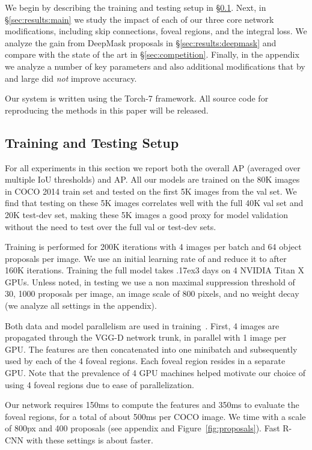 \documentclass{bmvc2k}
\newcommand{\app}{\raise.17ex\hbox{}}
\newcommand{\AP}[1]{AP\xspace}
\newcommand{\fig}[1]{Figure~\ref{fig:#1}}
\begin{document}
We begin by describing the training and testing setup in \S\ref{sec:results:setup}. Next, in \S\ref{sec:results:main} we study the impact of each of our three core network modifications, including skip connections, foveal regions, and the integral loss. We analyze the gain from DeepMask proposals in \S\ref{sec:results:deepmask} and compare with the state of the art in \S\ref{sec:competition}. Finally, in the appendix we analyze a number of key parameters and also additional modifications that by and large did \emph{not} improve accuracy. 

Our system is written using the Torch-7 framework. All source code for reproducing the methods in this paper will be released.

\subsection{Training and Testing Setup}\label{sec:results:setup}

For all experiments in this section we report both the overall AP (averaged over multiple IoU thresholds) and \AP{50}. All our models are trained on the 80K images in COCO 2014 train set and tested on the first 5K images from the val set. We find that testing on these 5K images correlates well with the full 40K val set and 20K test-dev set, making these 5K images a good proxy for model validation without the need to test over the full val or test-dev sets.

Training is performed for 200K iterations with 4 images per batch and 64 object proposals per image. We use an initial learning rate of  and reduce it to  after 160K iterations. Training the full model takes \app3 days on 4 NVIDIA Titan X GPUs. Unless noted, in testing we use a non maximal suppression threshold of 30, 1000 proposals per image, an image scale of 800 pixels, and no weight decay (we analyze all settings in the appendix).

Both data and model parallelism are used in training~\cite{owt}. First, 4 images are propagated through the VGG-D network trunk, in parallel with 1 image per GPU. The features are then concatenated into one minibatch and subsequently used by each of the 4 foveal regions. Each foveal region resides in a separate GPU. Note that the prevalence of 4 GPU machines helped motivate our choice of using 4 foveal regions due to ease of parallelization.

Our network requires 150ms to compute the features and 350ms to evaluate the foveal regions, for a total of about 500ms per COCO image. We time with a scale of 800px and 400 proposals (see appendix and \fig{proposals}). Fast R-CNN with these settings is about  faster.
\end{document}
